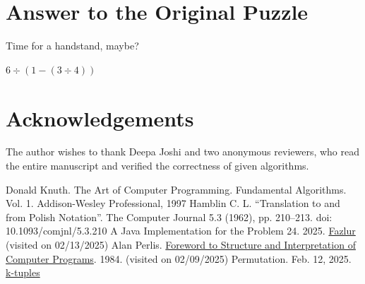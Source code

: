 \documentclass{resonance}
\begin{document}
\section{Answer to the Original Puzzle}

Time for a handstand, maybe?

\begin{rotanswer}
$6\div(1-(3\div 4))$
\end{rotanswer}


\section*{Acknowledgements}
The author wishes to thank Deepa Joshi and two anonymous reviewers, who read the entire manuscript and verified the correctness of given algorithms.   


\begin{thebibliography}{99} 
Donald Knuth. The Art of Computer Programming. Fundamental Algorithms. Vol. 1.  Addison-Wesley Professional, 1997
Hamblin C. L. “Translation to and from Polish Notation”. The Computer Journal 5.3 (1962), pp. 210–213. doi: 10.1093/comjnl/5.3.210
A Java Implementation for the Problem 24. 2025. \href{https://github.com/kedarmhaswade/impatiently-j8/blob/main/src/main/java/practice/Fazlur.java}{Fazlur} (visited on 02/13/2025)
Alan Perlis. \href{https://sourceacademy.org/sicpjs/foreword84}{Foreword to Structure and Interpretation of Computer Programs}. 1984. (visited on 02/09/2025)
Permutation. Feb. 12, 2025. \href{https://en.wikipedia.org/wiki/Permutation#Permutations_with_repetition}{k-tuples}
\end{thebibliography}
\end{document}
